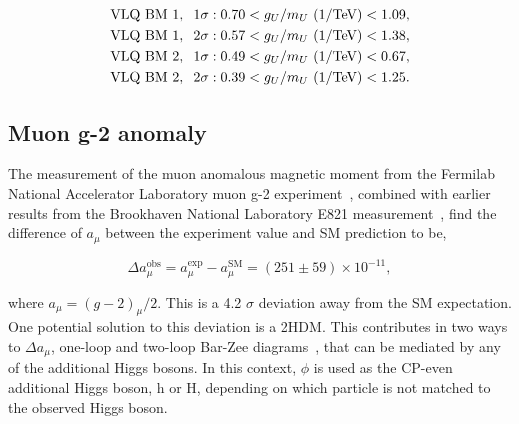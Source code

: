 \begin{align}
\begin{split}
\text{VLQ BM 1}, \hspace{0.2cm} 1\sigma&: 0.70 < g_{U}/m_{U} \text{ (1/TeV)} < 1.09, \\
\text{VLQ BM 1}, \hspace{0.2cm} 2\sigma&: 0.57 < g_{U}/m_{U} \text{ (1/TeV)} < 1.38, \\
\text{VLQ BM 2}, \hspace{0.2cm} 1\sigma&: 0.49 < g_{U}/m_{U} \text{ (1/TeV)} < 0.67, \\
\text{VLQ BM 2}, \hspace{0.2cm} 2\sigma&: 0.39 < g_{U}/m_{U} \text{ (1/TeV)} < 1.25.
\end{split}
\end{align}

\subsection{Muon g-2 anomaly}
\label{sec:gm2_anomaly}

The measurement of the muon anomalous magnetic moment from the Fermilab National Accelerator Laboratory muon g-2 experiment~\cite{Muong-2:2021ojo}, combined with earlier results from the Brookhaven National Laboratory E821 measurement~\cite{Muong-2:2006rrc}, find the difference of $a_\mu$ between the experiment value and \ac{SM} prediction to be,

\begin{equation}
\Delta a_{\mu}^{\text{obs}} = a_{\mu}^{\text{exp}} - a_{\mu}^{\text{SM}} = (251 \pm 59) \times 10^{-11},
\end{equation}

where $a_{\mu}=(g-2)_{\mu}/2$. 
This is a 4.2 $\sigma$ deviation away from the \ac{SM} expectation.
One potential solution to this deviation is a \ac{2HDM}.
This contributes in two ways to $\Delta a_{\mu}$, one-loop and two-loop Bar-Zee diagrams~\cite{Ilisie:2015tra,Barr:1990vd}, that can be mediated by any of the additional Higgs bosons.
In this context, $\phi$ is used as the \ac{CP}-even additional Higgs boson, h or H, depending on which particle is not matched to the observed Higgs boson. \\

